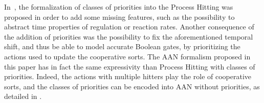 In~\cite{FPMR13-CS2Bio}, the formalization of classes of priorities into the Process Hitting
was proposed in order to add some missing features,
such as the possibility to abstract time properties of regulation or reaction rates.
Another consequence of the addition of priorities was the possibility to fix
the aforementioned temporal shift, and thus be able to model accurate Boolean gates,
by prioritizing the actions used to update the cooperative sorts.
The AAN formalism proposed in this paper has in fact the same expressivity than
Process Hitting with classes of priorities.
Indeed, the actions with multiple hitters play the role of cooperative sorts,
and the classes of priorities can be encoded into AAN without priorities,
as detailed in .
% 
